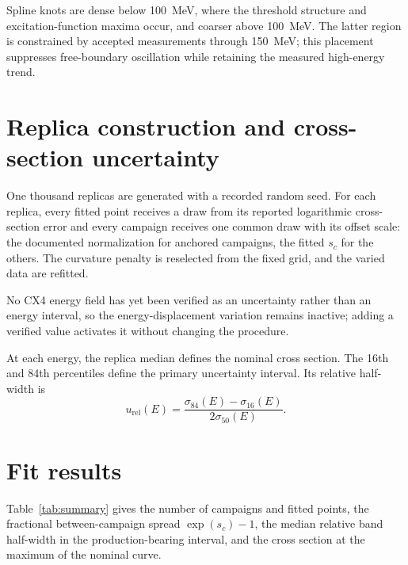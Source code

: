 \documentclass[11pt]{article}
\newcommand{\generateddir}{docs/generated/xsection_fit}
\newcommand{\generateddir}{generated/xsection_fit}
\begin{document}
Spline knots are dense below \SI{100}{MeV}, where the threshold structure and
excitation-function maxima occur, and coarser above \SI{100}{MeV}.  The latter
region is constrained by accepted measurements through \SI{150}{MeV}; this
placement suppresses free-boundary oscillation while retaining the measured
high-energy trend.

\section{Replica construction and cross-section uncertainty}

One thousand replicas are generated with a recorded random seed.  For each
replica, every fitted point receives a draw from its reported logarithmic
cross-section error and every campaign receives one common draw with its
offset scale: the documented normalization for anchored campaigns, the
fitted $s_c$ for the others.  The curvature penalty is reselected from the
fixed grid, and the varied data are refitted.

No CX4 energy field has yet been verified as an uncertainty rather than an
energy interval, so the energy-displacement variation remains inactive;
adding a verified value activates it without changing the procedure.

At each energy, the replica median defines the nominal cross section.  The
16th and 84th percentiles define the primary uncertainty interval.  Its
relative half-width is
\begin{equation}
  u_{\mathrm{rel}}(E)=
  \frac{\sigma_{84}(E)-\sigma_{16}(E)}{2\sigma_{50}(E)}.
\end{equation}

\section{Fit results}

Table~\ref{tab:summary} gives the number of campaigns and fitted points, the
fractional between-campaign spread $\exp(s_c)-1$, the median relative band
half-width in the production-bearing interval, and the cross section at the
maximum of the nominal curve.

\begin{table}[H]
\centering\small
\caption{EXFOR fit and uncertainty summary.  The peak interval is the 16th--84th
percentile interval evaluated at the maximum of the nominal curve.}
\label{tab:summary}
\setlength{\tabcolsep}{4pt}

\end{table}
\end{document}
